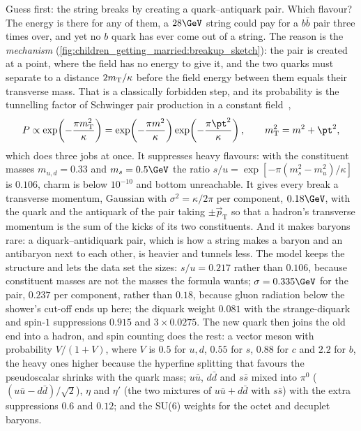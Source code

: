 Guess first: the string breaks by creating a quark--antiquark pair. Which
flavour? The energy is there for any of them, a $28\GeV$ string could pay
for a $b\bar b$ pair three times over, and yet no $b$ quark has ever come
out of a string. The reason is the \emph{mechanism}
(\cref{fig:children_getting_married:breakup_sketch}): the pair is created
at a point, where the field has no energy to give it, and the two quarks
must separate to a distance $2m_{\mathrm{T}}/\kappa$ before the field energy between
them equals their transverse mass. That is a classically forbidden step,
and its probability is the tunnelling factor of Schwinger pair production
in a constant field~\cite{Casher:1978wy},
\begin{equation}
  P\propto\exp\!\left(-\frac{\pi\mT^2}{\kappa}\right)
  =\exp\!\left(-\frac{\pi m^2}{\kappa}\right)\exp\!\left(-\frac{\pi\pt^2}{\kappa}\right),
  \qquad \mT^2=m^2+\pt^2,
  \label{eq:children_getting_married:tunnelling}
\end{equation}
which does three jobs at once. It suppresses heavy flavours: with the
constituent masses $m_{u,d}=0.33$ and $m_s=0.5\GeV$ the ratio
$s/u=\exp[-\pi(m_s^2-m_u^2)/\kappa]$ is $0.106$, charm is below $10^{-10}$
and bottom unreachable. It gives every break a transverse momentum,
Gaussian with $\sigma^2=\kappa/2\pi$ per component, $0.18\GeV$, with the
quark and the antiquark of the pair taking $\pm\vec p_{\mathrm{T}}$ so that
a hadron's transverse momentum is the sum of the kicks of its two
constituents. And it makes baryons rare: a diquark--antidiquark pair, which
is how a string makes a baryon and an antibaryon next to each other, is
heavier and tunnels less. The model keeps the structure and lets the data
set the sizes: $s/u=0.217$ rather than $0.106$, because constituent masses
are not the masses the formula wants; $\sigma=0.335\GeV$ for the pair,
$0.237$ per component, rather than $0.18$, because gluon radiation below
the shower's cut-off ends up here; the diquark weight $0.081$ with the
strange-diquark and spin-$1$ suppressions $0.915$ and $3\times0.0275$. The
new quark then joins the old end into a hadron, and spin counting does the
rest: a vector meson with probability $V/(1+V)$, where $V$ is $0.5$ for
$u,d$, $0.55$ for $s$, $0.88$ for $c$ and $2.2$ for $b$, the heavy ones
higher because the hyperfine splitting that favours the pseudoscalar shrinks
with the quark mass; $u\bar u$, $d\bar d$ and $s\bar s$ mixed into $\pi^0$
($(u\bar u-d\bar d)/\sqrt2$), $\eta$ and $\eta'$ (the two mixtures of
$u\bar u+d\bar d$ with $s\bar s$) with the extra suppressions $0.6$ and $0.12$; and the
SU(6) weights for the octet and decuplet baryons.

